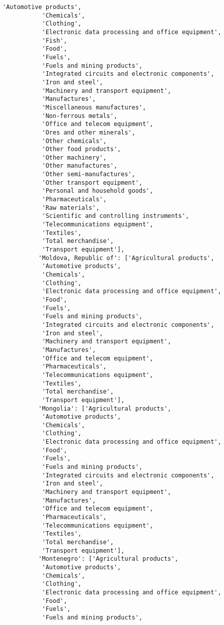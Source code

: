 \documentclass[11pt]{article}
\begin{document}
\begin{Verbatim}[commandchars=\\\{\}]
           'Automotive products',
           'Chemicals',
           'Clothing',
           'Electronic data processing and office equipment',
           'Fish',
           'Food',
           'Fuels',
           'Fuels and mining products',
           'Integrated circuits and electronic components',
           'Iron and steel',
           'Machinery and transport equipment',
           'Manufactures',
           'Miscellaneous manufactures',
           'Non-ferrous metals',
           'Office and telecom equipment',
           'Ores and other minerals',
           'Other chemicals',
           'Other food products',
           'Other machinery',
           'Other manufactures',
           'Other semi-manufactures',
           'Other transport equipment',
           'Personal and household goods',
           'Pharmaceuticals',
           'Raw materials',
           'Scientific and controlling instruments',
           'Telecommunications equipment',
           'Textiles',
           'Total merchandise',
           'Transport equipment'],
          'Moldova, Republic of': ['Agricultural products',
           'Automotive products',
           'Chemicals',
           'Clothing',
           'Electronic data processing and office equipment',
           'Food',
           'Fuels',
           'Fuels and mining products',
           'Integrated circuits and electronic components',
           'Iron and steel',
           'Machinery and transport equipment',
           'Manufactures',
           'Office and telecom equipment',
           'Pharmaceuticals',
           'Telecommunications equipment',
           'Textiles',
           'Total merchandise',
           'Transport equipment'],
          'Mongolia': ['Agricultural products',
           'Automotive products',
           'Chemicals',
           'Clothing',
           'Electronic data processing and office equipment',
           'Food',
           'Fuels',
           'Fuels and mining products',
           'Integrated circuits and electronic components',
           'Iron and steel',
           'Machinery and transport equipment',
           'Manufactures',
           'Office and telecom equipment',
           'Pharmaceuticals',
           'Telecommunications equipment',
           'Textiles',
           'Total merchandise',
           'Transport equipment'],
          'Montenegro': ['Agricultural products',
           'Automotive products',
           'Chemicals',
           'Clothing',
           'Electronic data processing and office equipment',
           'Food',
           'Fuels',
           'Fuels and mining products',

\end{Verbatim}
\end{document}
